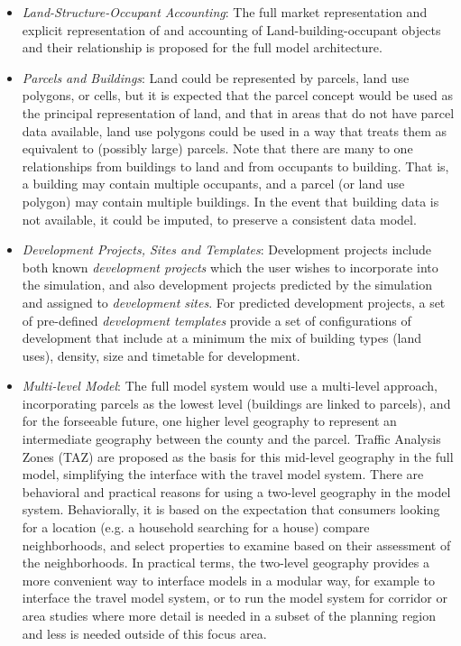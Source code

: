 \begin{itemize}

\item \emph{Land-Structure-Occupant Accounting}: The full market
representation and explicit representation of and accounting of
Land-building-occupant objects and their relationship is proposed
for the full model architecture.

\item \emph{Parcels and Buildings}: Land could be represented by
parcels, land use polygons, or cells, but it is expected that
the parcel concept would be used as the principal representation
of land, and that in areas that do not have parcel data available,
land use polygons could be used in a way that treats them as
equivalent to (possibly large) parcels.  Note that there are many
to one relationships from buildings to land and from occupants to
building.  That is, a building may contain multiple occupants,
and a parcel (or land use polygon) may contain multiple buildings.
In the event that building data is not available, it could be
imputed, to preserve a consistent data model.

\item \emph{Development Projects, Sites and Templates}: Development 
 projects include both
 known \emph{development projects} which the user wishes to
 incorporate into the simulation, and also development projects
 predicted by the simulation and assigned to \emph{development
 sites}.  For predicted development projects, a set of pre-defined
  \emph{development templates} provide a set of configurations of
  development that include at a minimum the mix of building types
  (land uses), density, size and timetable for development.

\item \emph{Multi-level Model}: The full model system would use
a multi-level approach, incorporating parcels as the lowest level
(buildings are linked to parcels), and for the forseeable future,
one higher level geography to represent an intermediate geography
between the county and the parcel.  Traffic Analysis Zones (TAZ)
are proposed as the basis for this mid-level geography in the full
 model, simplifying the interface with the travel model system.
 There are behavioral and practical reasons for using a two-level
 geography in the model system.  Behaviorally, it is based on the
 expectation that consumers looking for a location (e.g. a household
  searching for a house) compare neighborhoods, and select properties
  to examine based on their assessment of the neighborhoods. In
  practical terms, the two-level geography provides a more convenient
  way to interface models in a modular way, for example to interface
  the travel model system, or to run the model system for corridor or
  area studies where more detail is needed in a subset of the planning
  region and less is needed outside of this focus area.


\end{itemize}
